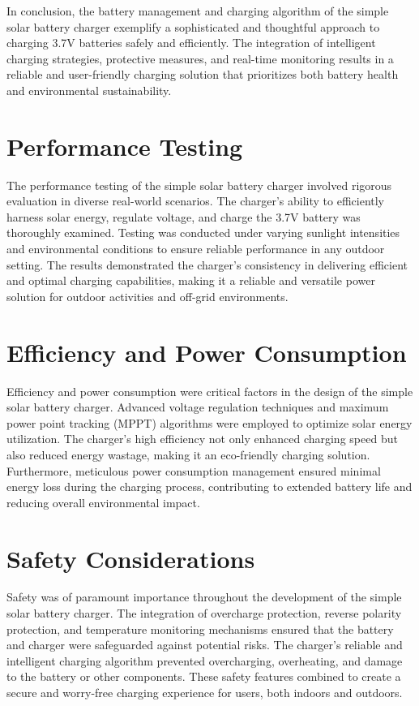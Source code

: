 \documentclass[twocolumn]{article}
\begin{document}
\noindent In conclusion, the battery management and charging algorithm of the simple solar battery charger exemplify a sophisticated and thoughtful approach to charging 3.7V batteries safely and efficiently. The integration of intelligent charging strategies, protective measures, and real-time monitoring results in a reliable and user-friendly charging solution that prioritizes both battery health and environmental sustainability.

\section*{Performance Testing}

The performance testing of the simple solar battery charger involved rigorous evaluation in diverse real-world scenarios. The charger's ability to efficiently harness solar energy, regulate voltage, and charge the 3.7V battery was thoroughly examined. Testing was conducted under varying sunlight intensities and environmental conditions to ensure reliable performance in any outdoor setting. The results demonstrated the charger's consistency in delivering efficient and optimal charging capabilities, making it a reliable and versatile power solution for outdoor activities and off-grid environments.

\section*{Efficiency and Power Consumption}

Efficiency and power consumption were critical factors in the design of the simple solar battery charger. Advanced voltage regulation techniques and maximum power point tracking (MPPT) algorithms were employed to optimize solar energy utilization. The charger's high efficiency not only enhanced charging speed but also reduced energy wastage, making it an eco-friendly charging solution. Furthermore, meticulous power consumption management ensured minimal energy loss during the charging process, contributing to extended battery life and reducing overall environmental impact.

\section*{Safety Considerations}

Safety was of paramount importance throughout the development of the simple solar battery charger. The integration of overcharge protection, reverse polarity protection, and temperature monitoring mechanisms ensured that the battery and charger were safeguarded against potential risks. The charger's reliable and intelligent charging algorithm prevented overcharging, overheating, and damage to the battery or other components. These safety features combined to create a secure and worry-free charging experience for users, both indoors and outdoors.
\end{document}
